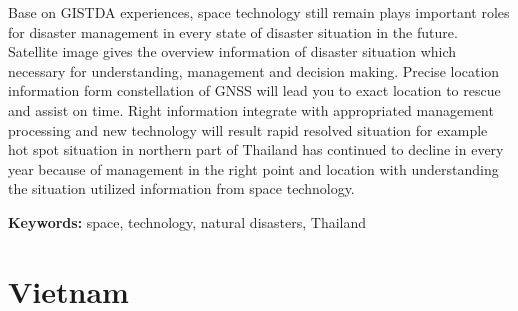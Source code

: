 {{\vspace{0.4 cm}

Base on GISTDA experiences, space technology still remain plays important roles for disaster management in every state of disaster situation in the future.  Satellite image gives the overview information of disaster situation which necessary for understanding, management and decision making. Precise location information form constellation of GNSS will lead you to exact location to rescue and assist on time. Right information integrate with appropriated management processing and new technology will result rapid resolved situation for example hot spot situation in northern part of Thailand has continued to decline in every year because of management in the right point and location with understanding the situation utilized information from space technology. 
\par}
\begin{center}
\textbf{Keywords:} space, technology, natural disasters, Thailand \par
\end{center}
}

\section{Vietnam}

\vspace{0.5 cm}

